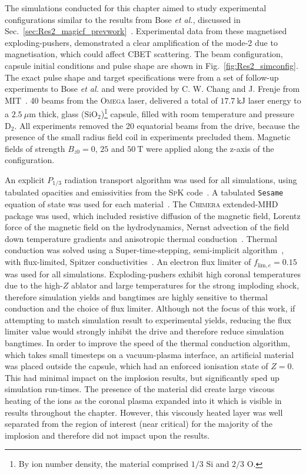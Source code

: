 The simulations conducted for this chapter aimed to study experimental configurations similar to the results from Bose \textit{et al.}, discussed in Sec.~\ref{sec:Res2_magicf_prevwork}~\cite{bose_effect_2022}.
Experimental data from these magnetised exploding-pushers, demonstrated a clear amplification of the mode-2 due to magnetisation, which could affect \ac{CBET} scattering.
The beam configuration, capsule initial conditions and pulse shape are shown in Fig.~\ref{fig:Res2_simconfig}.
The exact pulse shape and target specifications were from a set of follow-up experiments to Bose \textit{et al.} and were provided by C. W. Chang and J. Frenje from \ac{MIT}~\cite{chang_notitle_2023}.
40 beams from the \textsc{Omega} laser, delivered a total of $17.7\ \text{kJ}$ laser energy to a $2.5\ \mu\text{m}$ thick, glass ($\text{SiO}_2$)\footnote{By ion number density, the material comprised $1/3$ $\text{Si}$ and $2/3$ $\text{O}$.} capsule, filled with room temperature and pressure $\text{D}_2$.
All experiments removed the 20 equatorial beams from the drive, because the presence of the small radius field coil in experiments precluded them.
Magnetic fields of strength $B_{z0}=0$, $25$ and $50\ \text{T}$ were applied along the z-axis of the configuration.

An explicit $P_{1/3}$ radiation transport algorithm was used for all simulations, using tabulated opacities and emissivities from the \textsc{SpK} code~\cite{crilly_spk_2023}.
A tabulated \texttt{Sesame} equation of state was used for each material~\cite{mchardy_introduction_2018}.
The \textsc{Chimera} extended-\ac{MHD} package was used, which included resistive diffusion of the magnetic field, Lorentz force of the magnetic field on the hydrodynamics, Nernst advection of the field down temperature gradients and anisotropic thermal conduction~\cite{walsh_extended-magnetohydrodynamics_2020}.
Thermal conduction was solved using a Super-time-stepping, semi-implicit algorithm~\cite{vaidya_scalable_2017}, with flux-limited, Spitzer conductivities~\cite{spitzer_transport_1953}.
An electron flux limiter of $f_{\text{lim},e} = 0.15$ was used for all simulations.
Exploding-pushers exhibit high coronal temperatures due to the high-$Z$ ablator and large temperatures for the strong imploding shock, therefore simulation yields and bangtimes are highly sensitive to thermal conduction and the choice of flux limiter.
Although not the focus of this work, if attempting to match simulation result to experimental yields, reducing the flux limiter value would strongly inhibit the drive and therefore reduce simulation bangtimes.
In order to improve the speed of the thermal conduction algorithm, which takes small timesteps on a vacuum-plasma interface, an artificial material was placed outside the capsule, which had an enforced ionisation state of $Z=0$.
This had minimal impact on the implosion results, but significantly sped up simulation run-times.
The presence of the material did create large viscous heating of the ions as the coronal plasma expanded into it which is visible in results throughout the chapter.
However, this viscously heated layer was well separated from the region of interest (near critical) for the majority of the implosion and therefore did not impact upon the results.

